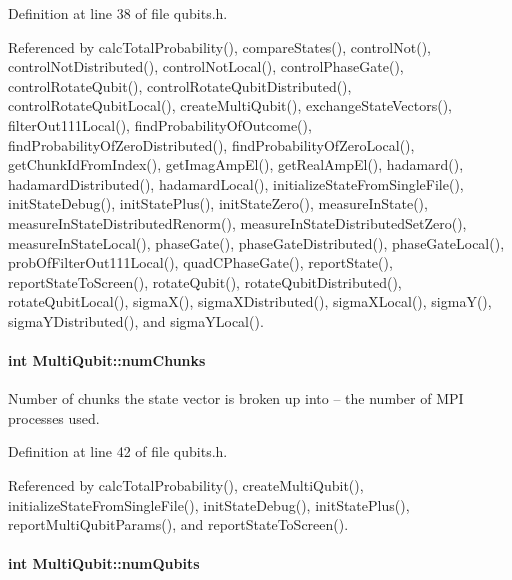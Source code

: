 Definition at line 38 of file qubits.\+h.



Referenced by calc\+Total\+Probability(), compare\+States(), control\+Not(), control\+Not\+Distributed(), control\+Not\+Local(), control\+Phase\+Gate(), control\+Rotate\+Qubit(), control\+Rotate\+Qubit\+Distributed(), control\+Rotate\+Qubit\+Local(), create\+Multi\+Qubit(), exchange\+State\+Vectors(), filter\+Out111\+Local(), find\+Probability\+Of\+Outcome(), find\+Probability\+Of\+Zero\+Distributed(), find\+Probability\+Of\+Zero\+Local(), get\+Chunk\+Id\+From\+Index(), get\+Imag\+Amp\+El(), get\+Real\+Amp\+El(), hadamard(), hadamard\+Distributed(), hadamard\+Local(), initialize\+State\+From\+Single\+File(), init\+State\+Debug(), init\+State\+Plus(), init\+State\+Zero(), measure\+In\+State(), measure\+In\+State\+Distributed\+Renorm(), measure\+In\+State\+Distributed\+Set\+Zero(), measure\+In\+State\+Local(), phase\+Gate(), phase\+Gate\+Distributed(), phase\+Gate\+Local(), prob\+Of\+Filter\+Out111\+Local(), quad\+C\+Phase\+Gate(), report\+State(), report\+State\+To\+Screen(), rotate\+Qubit(), rotate\+Qubit\+Distributed(), rotate\+Qubit\+Local(), sigma\+X(), sigma\+X\+Distributed(), sigma\+X\+Local(), sigma\+Y(), sigma\+Y\+Distributed(), and sigma\+Y\+Local().

\paragraph[{\texorpdfstring{num\+Chunks}{numChunks}}]{\setlength{\rightskip}{0pt plus 5cm}int Multi\+Qubit\+::num\+Chunks}\hypertarget{structMultiQubit_acd43f2f57991709c9e94f73662c972b2}{}\label{structMultiQubit_acd43f2f57991709c9e94f73662c972b2}


Number of chunks the state vector is broken up into -- the number of M\+PI processes used. 



Definition at line 42 of file qubits.\+h.



Referenced by calc\+Total\+Probability(), create\+Multi\+Qubit(), initialize\+State\+From\+Single\+File(), init\+State\+Debug(), init\+State\+Plus(), report\+Multi\+Qubit\+Params(), and report\+State\+To\+Screen().

\paragraph[{\texorpdfstring{num\+Qubits}{numQubits}}]{\setlength{\rightskip}{0pt plus 5cm}int Multi\+Qubit\+::num\+Qubits}\hypertarget{structMultiQubit_ab5b9795bdc6fb5855e1974dcbbaeb36f}{}\label{structMultiQubit_ab5b9795bdc6fb5855e1974dcbbaeb36f}


